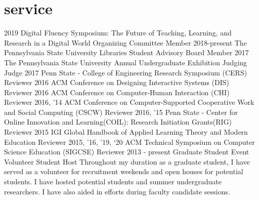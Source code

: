 \documentclass[]{cv-style}          %
\begin{document}
\section{service}
\vspace{-0.2cm}
\begin{entrylist}
\entry
{2019}
{Digital Fluency Symposium: The Future of Teaching, Learning, and Research in a Digital World}
{Organizing Committee Member}
{\vspace{-0.4cm}}
\entry
{2018-present}
{The Pennsylvania State University Libraries Student Advisory Board}
{Member}
{\vspace{-0.4cm}}
\entry
{2017}
{The Pennsylvania State University Annual Undergraduate Exhibition Judging}
{Judge}
{\vspace{-0.4cm}}
\entry
{2017}
{Penn State - College of Engineering Research Symposium (CERS)
}
{Reviewer}
{\vspace{-0.4cm}}
\entry
{2016}
{ACM Conference on Designing Interactive Systems (DIS)}
{Reviewer}
{\vspace{-0.4cm}}
\entry
{2016}
{ACM Conference on Computer-Human Interaction (CHI)
}
{Reviewer}
{\vspace{-0.4cm}}
\entry
{2016, '14}
{ACM Conference on Computer-Supported Cooperative Work and Social Computing (CSCW)
}
{Reviewer}
{\vspace{-0.4cm}}
\entry
{2016, '15}
{Penn State - Center for Online Innovation and Learning(COIL): Research Initiation Grants(RIG)
}
{Reviewer}
{\vspace{-0.4cm}}
\entry
{2015}
{IGI Global Handbook of Applied Learning Theory and Modern Education
}
{Reviewer}
{\vspace{-0.4cm}}
\entry
{2015, '16, '19, `20}
{ACM Technical Symposium on Computer Science Education (SIGCSE)
}
{Reviewer}
{\vspace{-0.4cm}}
\entry
{2013 - present}
{Graduate Student Event Volunteer
}
{Student Host }
{Throughout my duration as a graduate student, I have served as a volunteer for recruitment weekends and open houses for potential students. I have hosted potential students and summer undergraduate researchers. I have also aided in efforts during faculty candidate sessions.}
{\vspace{-0.4cm}}
\end{entrylist}
\end{document}
